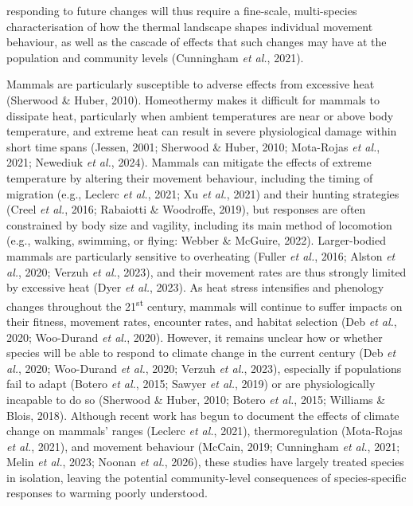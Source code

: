 \documentclass[
  12pt,
]{article}
\begin{document}
responding to future changes will thus require a fine-scale, multi-species characterisation of how the thermal landscape shapes individual movement behaviour, as well as the cascade of effects that such changes may have at the population and community levels (Cunningham \emph{et al.}, 2021).

Mammals are particularly susceptible to adverse effects from excessive heat (Sherwood \& Huber, 2010). Homeothermy makes it difficult for mammals to dissipate heat, particularly when ambient temperatures are near or above body temperature, and extreme heat can result in severe physiological damage within short time spans (Jessen, 2001; Sherwood \& Huber, 2010; Mota-Rojas \emph{et al.}, 2021; Newediuk \emph{et al.}, 2024). Mammals can mitigate the effects of extreme temperature by altering their movement behaviour, including the timing of migration (e.g., Leclerc \emph{et al.}, 2021; Xu \emph{et al.}, 2021) and their hunting strategies (Creel \emph{et al.}, 2016; Rabaiotti \& Woodroffe, 2019), but responses are often constrained by body size and vagility, including its main method of locomotion (e.g., walking, swimming, or flying: Webber \& McGuire, 2022). Larger-bodied mammals are particularly sensitive to overheating (Fuller \emph{et al.}, 2016; Alston \emph{et al.}, 2020; Verzuh \emph{et al.}, 2023), and their movement rates are thus strongly limited by excessive heat (Dyer \emph{et al.}, 2023). As heat stress intensifies and phenology changes throughout the 21\textsuperscript{st} century, mammals will continue to suffer impacts on their fitness, movement rates, encounter rates, and habitat selection (Deb \emph{et al.}, 2020; Woo-Durand \emph{et al.}, 2020). However, it remains unclear how or whether species will be able to respond to climate change in the current century (Deb \emph{et al.}, 2020; Woo-Durand \emph{et al.}, 2020; Verzuh \emph{et al.}, 2023), especially if populations fail to adapt (Botero \emph{et al.}, 2015; Sawyer \emph{et al.}, 2019) or are physiologically incapable to do so (Sherwood \& Huber, 2010; Botero \emph{et al.}, 2015; Williams \& Blois, 2018). Although recent work has begun to document the effects of climate change on mammals' ranges (Leclerc \emph{et al.}, 2021), thermoregulation (Mota-Rojas \emph{et al.}, 2021), and movement behaviour (McCain, 2019; Cunningham \emph{et al.}, 2021; Melin \emph{et al.}, 2023; Noonan \emph{et al.}, 2026), these studies have largely treated species in isolation, leaving the potential community-level consequences of species-specific responses to warming poorly understood.
\end{document}

